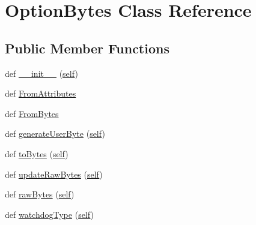 \hypertarget{classstm__tools_1_1serialflasher_1_1devices_1_1OptionBytes}{}\section{Option\+Bytes Class Reference}
\label{classstm__tools_1_1serialflasher_1_1devices_1_1OptionBytes}
\subsection*{Public Member Functions}
\begin{DoxyCompactItemize}
\item 
def \hyperlink{classstm__tools_1_1serialflasher_1_1devices_1_1OptionBytes_ae64f0875afe3067b97ba370b354b9213}{\+\_\+\+\_\+init\+\_\+\+\_\+} (\hyperlink{classstm__tools_1_1serialflasher_1_1devices_1_1OptionBytes_a9a04aa327fd016eb962c5799377e1f29}{self})
\item 
def \hyperlink{classstm__tools_1_1serialflasher_1_1devices_1_1OptionBytes_a382d9cfc8c5960396f6003674cecc20a}{From\+Attributes}
\item 
def \hyperlink{classstm__tools_1_1serialflasher_1_1devices_1_1OptionBytes_aacdb9f5b827de05bfefa79f379a2cd51}{From\+Bytes}
\item 
def \hyperlink{classstm__tools_1_1serialflasher_1_1devices_1_1OptionBytes_aa3e6e65c18eb7dd1ebb4c4988bf67dc3}{generate\+User\+Byte} (\hyperlink{classstm__tools_1_1serialflasher_1_1devices_1_1OptionBytes_a9a04aa327fd016eb962c5799377e1f29}{self})
\item 
def \hyperlink{classstm__tools_1_1serialflasher_1_1devices_1_1OptionBytes_a58a6ff9c9a0a432ab3b19b65c9977a7c}{to\+Bytes} (\hyperlink{classstm__tools_1_1serialflasher_1_1devices_1_1OptionBytes_a9a04aa327fd016eb962c5799377e1f29}{self})
\item 
def \hyperlink{classstm__tools_1_1serialflasher_1_1devices_1_1OptionBytes_ad4f22596222a06b30a766a352adc8c79}{update\+Raw\+Bytes} (\hyperlink{classstm__tools_1_1serialflasher_1_1devices_1_1OptionBytes_a9a04aa327fd016eb962c5799377e1f29}{self})
\item 
def \hyperlink{classstm__tools_1_1serialflasher_1_1devices_1_1OptionBytes_ac529349575475f39414293aade46af32}{raw\+Bytes} (\hyperlink{classstm__tools_1_1serialflasher_1_1devices_1_1OptionBytes_a9a04aa327fd016eb962c5799377e1f29}{self})
\item 
def \hyperlink{classstm__tools_1_1serialflasher_1_1devices_1_1OptionBytes_a54d7cb3878ecd7c655f9267237a72088}{watchdog\+Type} (\hyperlink{classstm__tools_1_1serialflasher_1_1devices_1_1OptionBytes_a9a04aa327fd016eb962c5799377e1f29}{self})

\end{DoxyCompactItemize}
